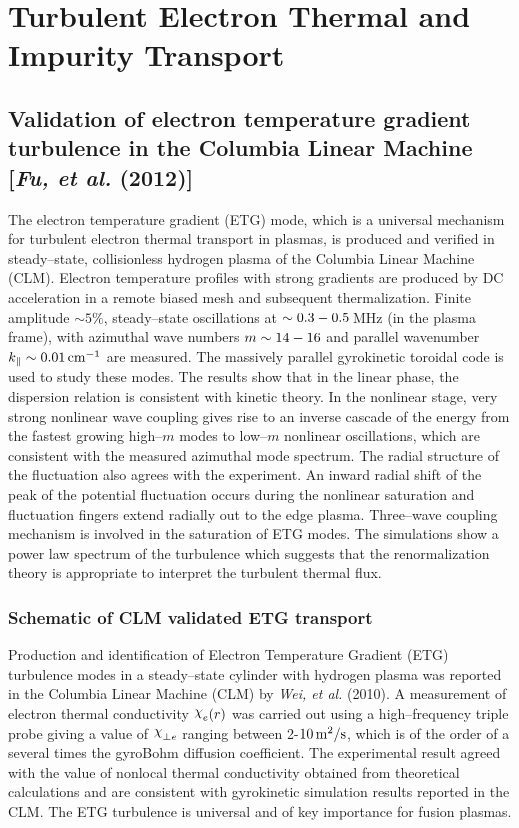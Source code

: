 \documentclass[a4paper,openany,12pt]{book}
\def\chix{\raise.5ex\hbox{$\chi$}}
\begin{document}

\chapter[Thermal and Impurity Transport]{Turbulent Electron Thermal and Impurity Transport}

\section[Validation of electron temperature gradient turbulence]{Validation of electron temperature gradient turbulence in the Columbia Linear Machine [\emph{Fu, et al.} (2012)]}

The electron temperature gradient (ETG) mode, which is a universal mechanism for turbulent electron thermal transport in plasmas, is produced and verified in steady--state, collisionless hydrogen plasma of the Columbia Linear Machine (CLM). Electron temperature profiles with strong gradients are produced by DC acceleration in a remote biased mesh and subsequent thermalization. Finite amplitude $\sim 5\%$, steady--state oscillations at $\sim\rm 0.3-0.5\,$MHz (in the plasma frame), with azimuthal wave numbers $m\sim\rm 14-16$ and parallel wavenumber $k_\|\sim 0.01\,\rm cm^{-1}$ are measured. The massively parallel gyrokinetic toroidal code is used to study these modes. The results show that in the linear phase, the dispersion relation is consistent with kinetic theory. In the nonlinear stage, very strong nonlinear wave coupling gives rise to an inverse cascade of the energy from the fastest growing high--$m$ modes to low--$m$ nonlinear oscillations, which are consistent with the measured azimuthal mode spectrum. The radial structure of the fluctuation also agrees with the experiment. An inward radial shift of the peak of the potential fluctuation occurs during the nonlinear saturation and fluctuation fingers extend radially out to the edge plasma. Three--wave coupling mechanism is involved in the saturation of ETG modes. The simulations show a power law spectrum of the turbulence which suggests that the renormalization theory is appropriate to interpret the turbulent thermal flux.

\subsection{Schematic of CLM validated ETG transport}

Production and identification of Electron Temperature Gradient (ETG) turbulence modes in a steady--state cylinder with hydrogen plasma was reported in the Columbia Linear Machine (CLM) by \emph{Wei, et al.} (2010). A measurement of electron thermal conductivity $\chix_e(r)$ was carried out using a high--frequency triple probe giving a value of $\chix_{\perp e}$ ranging between 2-$10\,\rm m^2/\rm s$, which is of the order of a several times the gyroBohm diffusion coefficient. The experimental result agreed with the value of nonlocal thermal conductivity obtained from theoretical calculations and are consistent with gyrokinetic simulation results reported in the CLM. The ETG turbulence is universal and of key importance for fusion plasmas.
\end{document}
